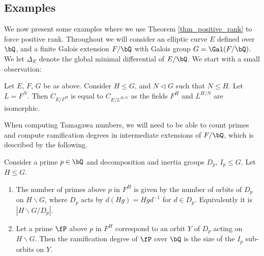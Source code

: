 \subsection{Examples}\label{sec_examples}

We now present some examples where we use Theorem \ref{thm_positive_rank} to force positive rank. Throughout we will consider an elliptic curve $E$ defined over $\bQ$, and a finite Galois extension $F / \bQ$ with Galois group $G = \Gal(F / \bQ)$. We let $\Delta_E$ denote the global minimal differential of $E / \bQ$. 
We start with a small observation:

\begin{rem}
   Let $E$, $F$, $G$ be as above. Consider $H \leq G$, and $N \triangleleft G$ such that $N \leq H$. Let $L = F^N$. Then $C_{E / F^H}$ is equal to $C_{E / L^{H/N}}$ as the fields $F^H$ and $L^{H/ N}$ are isomorphic. 
    
\end{rem}



When computing Tamagawa numbers, we will need to be able to count primes and compute ramification degrees in intermediate extensions of $F / \bQ$, which is described by the following. 

\begin{exercise}\label{ex-counting}
Consider a prime $p \in \bQ$ and decomposition and inertia groups $D_p$, $I_p \leq G$. Let $H \leq G$. 
\begin{enumerate}
    \setlength\itemsep{0em}
    \item The number of primes above $p$ in $F^H$ is given by the number of orbits of $D_p$ on $H \backslash G$, where $D_p$ acts by $d(Hg) = H g d^{-1}$ for $d \in D_p$. Equivalently it is $|H \backslash G / D_p|$.
    \item Let a prime $\fP$ above $p$ in $F^H$ correspond to an orbit $Y$ of $D_p$ acting on $H \backslash G$. Then the ramification degree of $\fP$ over $\bQ$ is the size of the $I_p$ sub-orbits on $Y$. 
\end{enumerate}
\end{exercise}


